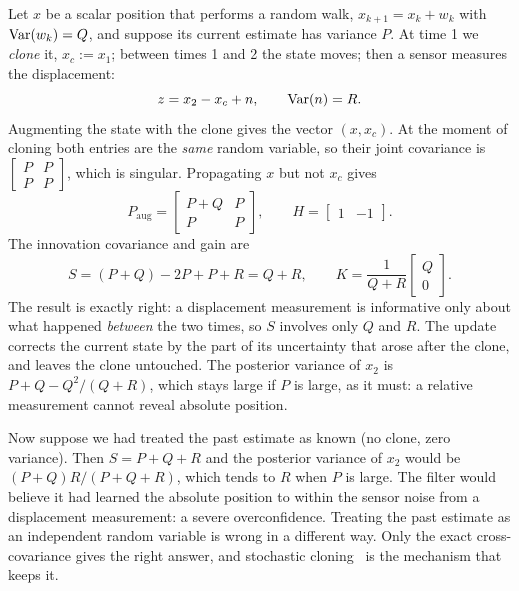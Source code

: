 Let $x$ be a scalar position that performs a random walk, $x_{k+1} = x_k + w_k$ with $\operatorname{Var}(w_k) = Q$, and suppose its
current estimate has variance $P$. At time 1 we \emph{clone} it, $x_c := x_1$; between times 1 and 2 the state moves; then a
sensor measures the displacement:
\begin{equation}
  z = x_2 - x_c + n, \qquad \operatorname{Var}(n) = R .
\end{equation}
Augmenting the state with the clone gives the vector $(x, x_c)$. At the moment of cloning both entries are the \emph{same}
random variable, so their joint covariance is $\begin{bmatrix} P & P \\ P & P\end{bmatrix}$, which is singular. Propagating $x$ but
not $x_c$ gives
\begin{equation}
  P_{\mathrm{aug}} = \begin{bmatrix} P + Q & P \\ P & P \end{bmatrix}, \qquad H = \begin{bmatrix} 1 & -1 \end{bmatrix}.
\end{equation}
The innovation covariance and gain are
\begin{equation}
  S = (P + Q) - 2P + P + R = Q + R, \qquad K = \frac{1}{Q + R}\begin{bmatrix} Q \\ 0 \end{bmatrix}.
\end{equation}
The result is exactly right: a displacement measurement is informative only about what happened \emph{between} the two
times, so $S$ involves only $Q$ and $R$. The update corrects the current state by the part of its uncertainty that arose
after the clone, and leaves the clone untouched. The posterior variance of $x_2$ is $P + Q - Q^2/(Q + R)$, which stays
large if $P$ is large, as it must: a relative measurement cannot reveal absolute position.

Now suppose we had treated the past estimate as known (no clone, zero variance). Then $S = P + Q + R$ and the posterior
variance of $x_2$ would be $(P + Q)R/(P + Q + R)$, which tends to $R$ when $P$ is large. The filter would believe it had
learned the absolute position to within the sensor noise from a displacement measurement: a severe overconfidence.
Treating the past estimate as an independent random variable is wrong in a different way. Only the exact
cross-covariance gives the right answer, and stochastic cloning~\cite{roumeliotis2002cloning} is the mechanism that keeps it.

